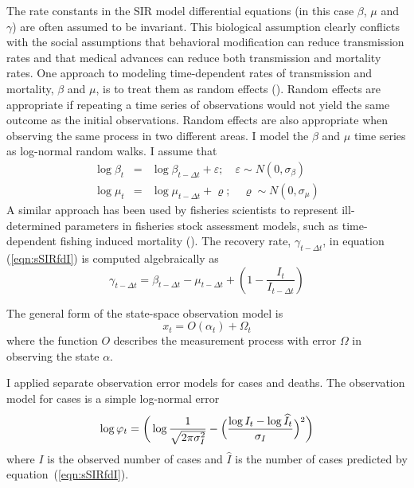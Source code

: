 \documentclass[12pt,letterpaper]{article}
\begin{document}
The rate constants in the SIR model differential equations (in this
case $\beta$, $\mu$ and $\gamma$) are often assumed to be invariant.
This biological assumption clearly conflicts with the social
assumptions
that behavioral modification can reduce transmission rates and
that medical advances can reduce both transmission and mortality
rates.
One approach to modeling time-dependent rates of transmission and
mortality, $\beta$ and $\mu$, is to treat them as random effects
(\cite{Skaug2006}). Random effects are appropriate if repeating a time
series of observations would not yield the same outcome as the initial
observations. Random effects are also appropriate when observing
the same process in two different areas. I model the  $\beta$ and
$\mu$ time series as log-normal random walks. I assume that
\begin{eqnarray}
\log\beta_t &=& \log\beta_{t-\Delta t}+\varepsilon;\quad \varepsilon\sim 
N(0,\sigma_\beta)\\
\log\mu_t &=& \log\mu_{t-\Delta t}+\varrho;\quad \varrho\sim
N(0,\sigma_\mu)
\end{eqnarray}
A similar approach has been used by fisheries scientists to represent
ill-determined parameters in fisheries stock assessment models, such
as time-dependent fishing induced mortality
(\cite{Nielsen2014b,Sibert2017}).
The recovery rate, $\gamma_{t-\Delta t}$, in equation
(\ref{eqn:sSIRfdI}) is computed algebraically as
\begin{equation}
\gamma_{t-\Delta t} = \beta_{t-\Delta t} - \mu_{t-\Delta t} +
(1-\frac{I_t}{I_{t-\Delta t}})
\end{equation}

The general form of the state-space observation model is
\begin{equation}
x_t = O(\alpha_t) + \Omega_t
\end{equation}
where the function $O$ describes the measurement process with
error $\Omega$ in observing the state $\alpha$.

I applied separate observation error models for cases and
deaths. The observation model for cases is a simple log-normal error
\begin{equation}
\label{eqn:logNlike}
\log\varphi_t = \bigg(\log\frac{1}{\sqrt{2\pi\sigma^2_I}} -\Bigl(\frac{\log
I_t-\log\widehat{I}_t}{\sigma_I}\Bigr)^2\bigg)\\
\end{equation}
where $I$ is the observed number of cases and $\widehat{I}$ is the
number of cases predicted by equation~(\ref{eqn:sSIRfdI}).
\end{document}
